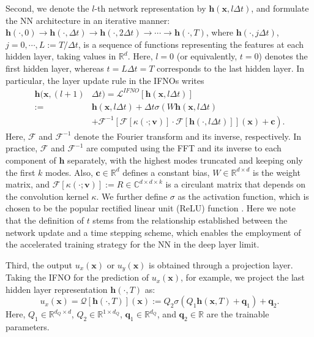 \documentclass[twocolumn,10pt]{asme2ej}
\renewcommand{\~}{\tilde}
\renewcommand{\-}{\bar}
\newcommand{\8}{\infty}
\numberwithin{equation}{section}
\newcommand{\real}{\mathbb{R}}
\newcommand{\complex}{\mathbb{C}}
\newcommand{\mcL}{\mathcal{L}}
\def \vb{\bm{v}}
\def \xb{\bm{x}}
\def \hb{\bm{h}}
\def \qb{\bm{q}}
\def \cb{\bm{c}}
\begin{document}
Second, we denote the $l$-th network representation by $\hb(\xb,l\Delta t)$, and formulate the NN architecture in an iterative manner: $\hb(\cdot,0)\rightarrow \hb(\cdot,\Delta t)\rightarrow\hb(\cdot,2\Delta t)\rightarrow \cdots \rightarrow \hb(\cdot,T)$, where $\hb(\cdot,j\Delta t)$, $j=0,\cdots,L:=T/\Delta t$, is a sequence of functions representing the features at each hidden layer, taking values in $\real^{d}$. Here, $l=0$ (or equivalently, $t=0$) denotes the first hidden layer, whereas $t=L\Delta t=T$ corresponds to the last hidden layer. In particular, the layer update rule in the IFNOs writes
\begin{align*}
\nonumber\hb(\xb,(l+1)&\Delta t)=\mcL^{IFNO}[\hb(\xb,l\Delta t)]\\
:=&\hb(\xb,l\Delta t)+ {\Delta t}\sigma\left(W\hb(\xb,l\Delta t)\right.\\
&\left.+\mathcal{F}^{-1}[\mathcal{F}[\kappa(\cdot;\vb)]\cdot \mathcal{F}[\hb(\cdot,l\Delta t)]](\xb)+ \cb\right).\label{eq:IFNO}
\end{align*}
Here, $\mathcal{F}$ and $\mathcal{F}^{-1}$ denote the Fourier transform and its inverse, respectively. In practice, $\mathcal{F}$ and $\mathcal{F}^{-1}$ are computed using the FFT and its inverse to each component of $\hb$ separately, with the highest modes truncated and keeping only the first $k$ modes. Also, $\cb\in\real^{d}$ defines a constant bias, $W\in\real^{d\times d}$ is the weight matrix, and $\mathcal{F}[\kappa(\cdot;\vb)]:=R\in\complex^{d\times d\times k}$ is a circulant matrix that depends on the convolution kernel $\kappa$. We further define $\sigma$ as the activation function, which is chosen to be the popular rectified linear unit (ReLU) function \cite{agarap2018deep}. Here we note that the definition of $t$ stems from the relationship established between the network update and a time stepping scheme, which enables the employment of the accelerated training strategy for the NN in the deep layer limit. 

Third, the output $u_x(\xb)$ or $u_y(\xb)$ is obtained through a projection layer. Taking the IFNO for the prediction of $u_x(\xb)$, for example, we project the last hidden layer representation $\hb(\cdot,T)$ as:
$$u_x(\xb)=\mathcal{Q}[\hb(\cdot,T)](\xb):=Q_2\sigma(Q_1\hb(\xb,T)+\qb_1)+\qb_2.$$
Here, $Q_1\in\real^{d_{Q}\times d}$, $Q_2\in\real^{1\times d_Q}$, $\qb_1\in\real^{d_Q}$, and $\qb_2\in\real$ are the trainable parameters.
\end{document}

